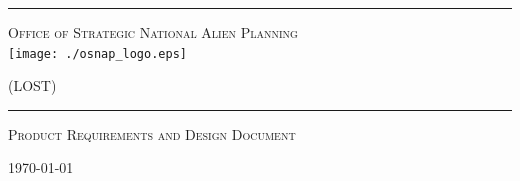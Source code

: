 \begin{titlepage}
\begin{center}

\rule{\linewidth}{0.5mm}

\textsc{\large Office of Strategic National Alien Planning}
~\\[1cm]
\texttt{[image: ./osnap\_logo.eps]}~\\[1cm]

{\Huge \linespread{2}}

\vspace{10pt}

\textsc{\Large (LOST)}

\rule{\linewidth}{0.5mm}

\vfill

\textsc{\Large Product Requirements and Design Document}


\vfill
{\large \today}

\end{center}
\end{titlepage}
